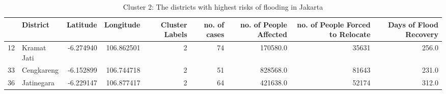 \begin{table}
\centering
\caption{Cluster 2: The districts with highest risks of flooding in Jakarta}
\label{tab:2}
\begin{adjustbox}{width=\textwidth}
\begin{tabular}{llrrrrrrr}
\toprule
{} &     District &  Latitude &   Longitude &  Cluster Labels &  no. of cases &  no. of People Affected &  no. of People Forced to Relocate &  Days of Flood Recovery \\
\midrule
12 &  Kramat Jati & -6.274940 &  106.862501 &               2 &            74 &                170580.0 &                             35631 &                   256.0 \\
33 &   Cengkareng & -6.152899 &  106.744718 &               2 &            51 &                828568.0 &                             81643 &                   231.0 \\
36 &   Jatinegara & -6.229147 &  106.877417 &               2 &            64 &                421638.0 &                             52174 &                   312.0 \\
\bottomrule
\end{tabular}
\end{adjustbox}
\end{table}

